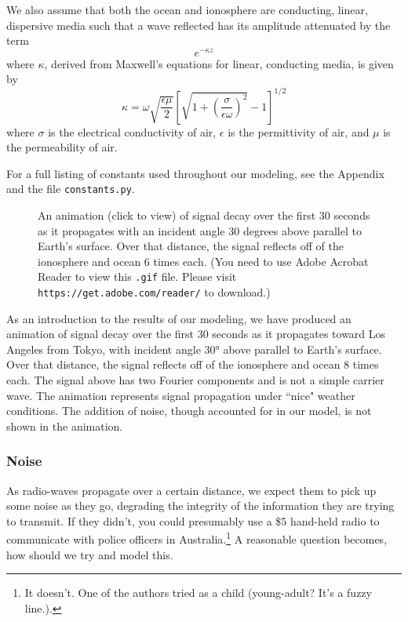 \documentclass[11pt]{article}
\numberwithin{equation}{section}
\begin{document}
\par We also assume that both the ocean and ionosphere are conducting, linear, dispersive media such that a wave reflected has its amplitude attenuated by the term
\[
e^{-\kappa z}
\]
where $\kappa$, derived from Maxwell's equations for linear, conducting media\cite{griffiths2005introduction}, is given by
\begin{equation}
\kappa = \omega \sqrt{\frac{\epsilon\mu}{2}}\left[ \sqrt{1 + \left( \frac{\sigma}{\epsilon\omega} \right)^2} - 1 \right]^{1/2}
\end{equation}
where $\sigma$ is the electrical conductivity of air, $\epsilon$ is the permittivity of air, and $\mu$ is the permeability of air.
\par For a full listing of constants used throughout our modeling, see the Appendix and the file \verb|constants.py|.

 \begin{figure}[ht]
     \begin{center}
     \end{center}
     \caption{An animation (click to view) of signal decay over the first 30 seconds as it propagates with an incident angle 30 degrees above parallel to Earth's surface. Over that distance, the signal reflects off of the ionosphere and ocean 6 times each. (You need to use Adobe Acrobat Reader to view this \texttt{.gif} file. Please visit \texttt{https://get.adobe.com/reader/} to download.)}
 \end{figure}
 
As an introduction to the results of our modeling, we have produced an animation of signal decay over the first 30 seconds as it propagates toward Los Angeles from Tokyo, with incident angle 30\si{\degree} above parallel to Earth's surface. Over that distance, the signal reflects off of the ionosphere and ocean 8 times each. The signal above has two Fourier components and is not a simple carrier wave. The animation represents signal propagation under ``nice" weather conditions. The addition of noise, though accounted for in our model, is not shown in the animation. 

\subsubsection{Noise} %
\label{ssub:noise}

As radio-waves propagate over a certain distance, we expect them to pick up some noise as they go, degrading the integrity of the information they are trying to transmit. If they didn't, you could presumably use a \$5 hand-held radio to communicate with police officers in Australia.\footnote{It doesn't. One of the authors tried as a child (young-adult? It's a fuzzy line.).} A reasonable question becomes, how should we try and model this.
\end{document}
